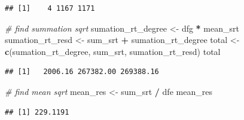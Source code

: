 \documentclass[]{article}
\newenvironment{Shaded}{\begin{snugshade}}{\end{snugshade}}
\newcommand{\CommentTok}[1]{\textcolor[rgb]{0.56,0.35,0.01}{\textit{#1}}}
\newcommand{\DecValTok}[1]{\textcolor[rgb]{0.00,0.00,0.81}{#1}}
\newcommand{\FloatTok}[1]{\textcolor[rgb]{0.00,0.00,0.81}{#1}}
\newcommand{\KeywordTok}[1]{\textcolor[rgb]{0.13,0.29,0.53}{\textbf{#1}}}
\newcommand{\NormalTok}[1]{#1}
\newcommand{\OperatorTok}[1]{\textcolor[rgb]{0.81,0.36,0.00}{\textbf{#1}}}
\newcommand{\StringTok}[1]{\textcolor[rgb]{0.31,0.60,0.02}{#1}}
\begin{document}
\begin{Shaded}
\end{Shaded}

\begin{verbatim}
## [1]    4 1167 1171
\end{verbatim}

\begin{Shaded}
\begin{Highlighting}[]
\CommentTok{# find summation sqrt}
\NormalTok{sumation_rt_degree <-}\StringTok{ }\NormalTok{dfg }\OperatorTok{*}\StringTok{ }\NormalTok{mean_srt}
\NormalTok{sumation_rt_resd <-}\StringTok{ }\NormalTok{sum_srt }\OperatorTok{+}\StringTok{ }\NormalTok{sumation_rt_degree}
\NormalTok{total <-}\StringTok{ }\KeywordTok{c}\NormalTok{(sumation_rt_degree, sum_srt, sumation_rt_resd)}
\NormalTok{total}
\end{Highlighting}
\end{Shaded}

\begin{verbatim}
## [1]   2006.16 267382.00 269388.16
\end{verbatim}

\begin{Shaded}
\begin{Highlighting}[]
\CommentTok{# find mean sqrt }
\NormalTok{mean_res <-}\StringTok{ }\NormalTok{sum_srt }\OperatorTok{/}\StringTok{ }\NormalTok{dfe}
\NormalTok{mean_res}
\end{Highlighting}
\end{Shaded}

\begin{verbatim}
## [1] 229.1191
\end{verbatim}
\end{document}
